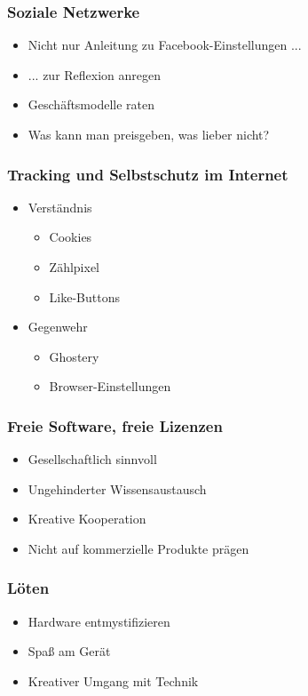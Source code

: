 \documentclass[12pt]{beamer}
\begin{document}
\begin{frame}
  \frametitle{Soziale Netzwerke}
  \begin{itemize}
    \item<2-> Nicht nur Anleitung zu Facebook-Einstellungen ...
    \item<3-> ... zur Reflexion anregen
    \item<4-> Geschäftsmodelle raten
    \item<5-> Was kann man preisgeben, was lieber nicht?
  \end{itemize}
\end{frame}

\begin{frame}
  \frametitle{Tracking und Selbstschutz im Internet}
  \begin{itemize}
    \item<2-> Verständnis
    \begin{itemize}
      \item Cookies
      \item Zählpixel
      \item Like-Buttons
    \end{itemize}
    \item<3-> Gegenwehr
    \begin{itemize}
      \item Ghostery
      \item Browser-Einstellungen
    \end{itemize}
  \end{itemize}
\end{frame}

\begin{frame}
  \frametitle{Freie Software, freie Lizenzen}
  \begin{itemize}
    \item<2-> Gesellschaftlich sinnvoll
    \item<3-> Ungehinderter Wissensaustausch
    \item<4-> Kreative Kooperation
    \item<5-> Nicht auf kommerzielle Produkte prägen
  \end{itemize}
\end{frame}

\begin{frame}
  \frametitle{Löten}
  \begin{itemize}
    \item<2-> Hardware entmystifizieren
    \item<3-> Spaß am Gerät
    \item<4-> Kreativer Umgang mit Technik
  \end{itemize}
\end{frame}
\end{document}

